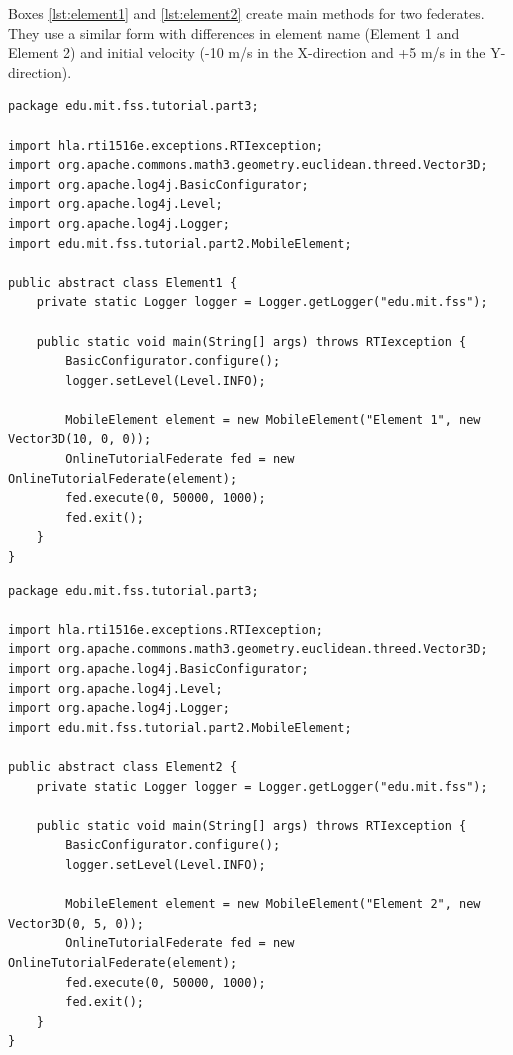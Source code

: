 \documentclass[]{article}
\begin{document}
Boxes \ref{lst:element1} and \ref{lst:element2} create main methods for two federates. They use a similar form with differences in element name (Element 1 and Element 2) and initial velocity (-10 m/s in the X-direction and +5 m/s in the Y-direction).

\begin{Code}
\begin{lstlisting}[caption={Element1 object class},label={lst:element1}]
package edu.mit.fss.tutorial.part3;

import hla.rti1516e.exceptions.RTIexception;
import org.apache.commons.math3.geometry.euclidean.threed.Vector3D;
import org.apache.log4j.BasicConfigurator;
import org.apache.log4j.Level;
import org.apache.log4j.Logger;
import edu.mit.fss.tutorial.part2.MobileElement;

public abstract class Element1 {
	private static Logger logger = Logger.getLogger("edu.mit.fss");

	public static void main(String[] args) throws RTIexception {
		BasicConfigurator.configure();
		logger.setLevel(Level.INFO);
		
		MobileElement element = new MobileElement("Element 1", new Vector3D(10, 0, 0));
		OnlineTutorialFederate fed = new OnlineTutorialFederate(element);
		fed.execute(0, 50000, 1000);
		fed.exit();
	}
}
\end{lstlisting}
\end{Code}

\begin{Code}
\begin{lstlisting}[caption={Element2 object class},label={lst:element2}]
package edu.mit.fss.tutorial.part3;

import hla.rti1516e.exceptions.RTIexception;
import org.apache.commons.math3.geometry.euclidean.threed.Vector3D;
import org.apache.log4j.BasicConfigurator;
import org.apache.log4j.Level;
import org.apache.log4j.Logger;
import edu.mit.fss.tutorial.part2.MobileElement;

public abstract class Element2 {
	private static Logger logger = Logger.getLogger("edu.mit.fss");

	public static void main(String[] args) throws RTIexception {
		BasicConfigurator.configure();
		logger.setLevel(Level.INFO);
		
		MobileElement element = new MobileElement("Element 2", new Vector3D(0, 5, 0));
		OnlineTutorialFederate fed = new OnlineTutorialFederate(element);
		fed.execute(0, 50000, 1000);
		fed.exit();
	}
}
\end{lstlisting}
\end{Code}
\end{document}
